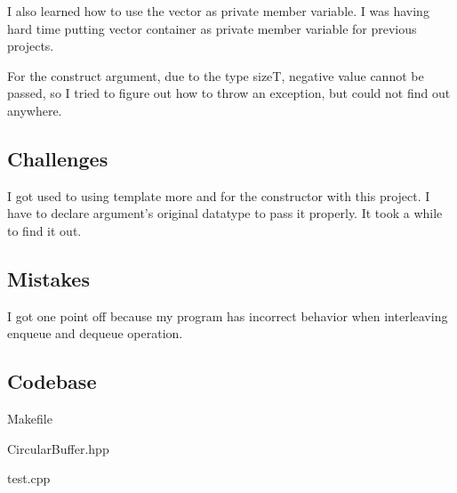 I also learned how to use the vector as private member variable. I was having hard time putting vector container as private member variable for previous projects.

For the construct argument, due to the type sizeT, negative value cannot be passed, so I tried to figure out how to throw an exception, but could not find out anywhere.

\subsection{Challenges}\label{sec:ps4a:challenges}

I got used to using template more and for the constructor with this project. I have to declare argument's original datatype to pass it properly. It took a while to find it out.

\subsection{Mistakes}\label{sec:ps4a:mistakes}

I got one point off because my program has incorrect behavior when interleaving enqueue and dequeue operation.

\subsection{Codebase}\label{sec:ps4a:code}
Makefile

CircularBuffer.hpp

test.cpp


\newpage
